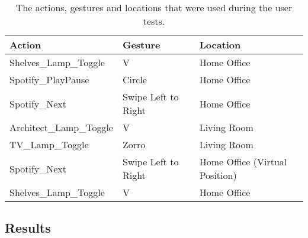 \begin{table}[]
\centering
\begin{tabular}{|l|l|l|}
\hline
\textbf{Action}                  & \textbf{Gesture}             & \textbf{Location}                       \\ \hline
Shelves\_Lamp\_Toggle   & V                   & Home Office                    \\ \hline
Spotify\_PlayPause      & Circle              & Home Office                    \\ \hline
Spotify\_Next           & Swipe Left to Right & Home Office                    \\ \hline
Architect\_Lamp\_Toggle & V                   & Living Room                    \\ \hline
TV\_Lamp\_Toggle        & Zorro               & Living Room                    \\ \hline
Spotify\_Next           & Swipe Left to Right & Home Office (Virtual Position) \\ \hline
Shelves\_Lamp\_Toggle   & V                   & Home Office                    \\ \hline
\end{tabular}
\caption{The actions, gestures and locations that were used during the user tests.}
\label{table:user-test-tasks}
\end{table}

\subsection{Results}
\label{sec:evaluation:user-tests-results}

